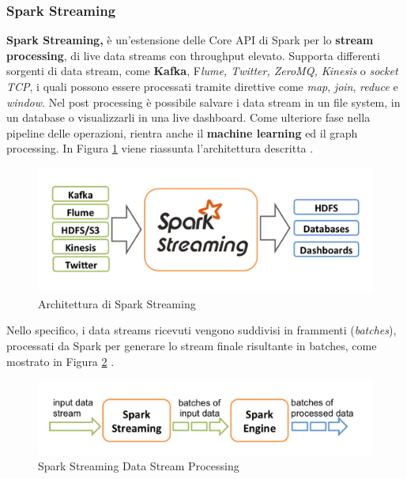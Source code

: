 \documentclass[12pt]{article}
\begin{document}
\subsubsection{Spark Streaming}

\textbf{Spark Streaming,} è un'estensione delle Core API di Spark per lo\textbf{ stream processing}, di live data streams con throughput elevato. Supporta differenti sorgenti di data stream, come\textbf{ Kafka}, F\textit{lume, Twitter, ZeroMQ, Kinesis} o \textit{socket TCP}, i quali possono essere processati tramite direttive come \textit{map}, \textit{join}, \textit{reduce} e \textit{window}. Nel post processing è possibile salvare i data stream in un file system, in un database o visualizzarli in una live dashboard. Come ulteriore fase nella pipeline delle operazioni, rientra anche il \textbf{machine learning} ed il graph processing. In Figura \ref{spark-streaming} viene riassunta l'architettura descritta \cite{spark}. 

\begin{figure}[H]
	\centering
	\includegraphics[scale=0.50]{images/streaming-arch.png}
	\caption{Architettura di Spark Streaming \cite{spark}}
	\label{spark-streaming}
\end{figure}

Nello specifico, i data streams ricevuti vengono suddivisi in frammenti (\textit{batches}), processati da Spark per generare lo stream finale risultante in batches, come mostrato in Figura \ref{spark-streaming-processing} \cite{spark}.

\begin{figure}[H]
	\centering
	\includegraphics[scale=0.70]{images/streaming-flow.png}
	\caption{Spark Streaming Data Stream Processing \cite{spark}}
	\label{spark-streaming-processing}
\end{figure}
\end{document}
